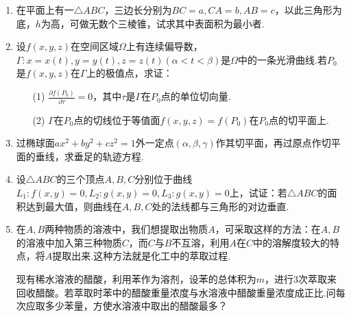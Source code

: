 \begin{enumerate}
	\item 在平面上有一$\triangle ABC$，三边长分别为$BC=a,CA=b,AB=c$，以此三角形为底，$h$为高，可做无数个三棱锥，试求其中表面积为最小者.
	\item 设$f(x,y,z)$在空间区域$\Omega$上有连续偏导数，$\Gamma : x=x(t), y=y(t), z=z(t)(\alpha<t<\beta)$是$\Omega$中的一条光滑曲线.若$P_{0}$是$f(x,y,z)$在$\Gamma$上的极值点，求证：
	\begin{enumerate}
		\item [(1)]$\frac{\partial f\left(P_{0}\right)}{\partial \tau}=0$，其中$\tau$是$\Gamma$在$P_{0}$点的单位切向量.
		\item [(2)]$\Gamma$在$P_{0}$点的切线位于等值面$f(x, y, z)=f\left(P_{0}\right)$在$P_{0}$点的切平面上.
	\end{enumerate}
	\item 过椭球面$a x^{2}+b y^{2}+c z^{2}=1$外一定点$(\alpha, \beta, \gamma)$作其切平面，再过原点作切平面的垂线，求垂足的轨迹方程.
	
	\item 设$\triangle ABC$的三个顶点$A,B,C$分别位于曲线$L_{1} : f(x, y)=0, L_{2} : g(x, y)=0,  L_{3} :  g(x, y)=0$上，试证：若$\triangle ABC$的面积达到最大值，则曲线在$A,B,C$处的法线都与三角形的对边垂直.
	\item  在$A,B$两种物质的溶液中，我们想提取出物质$A$，可采取这样的方法：在$A,B$的溶液中加入第三种物质$C$，而$C$与$B$不互溶，利用$A$在$C$中的溶解度较大的特点，将$A$提取出来.这种方法就是化工中的萃取过程.
	
	现有稀水溶液的醋酸，利用苯作为溶剂，设苯的总体积为$m$，进行3次萃取来回收醋酸。若萃取时苯中的醋酸重量浓度与水溶液中醋酸重量浓度成正比.问每次应取多少苯量，方使水溶液中取出的醋酸最多？
\end{enumerate}